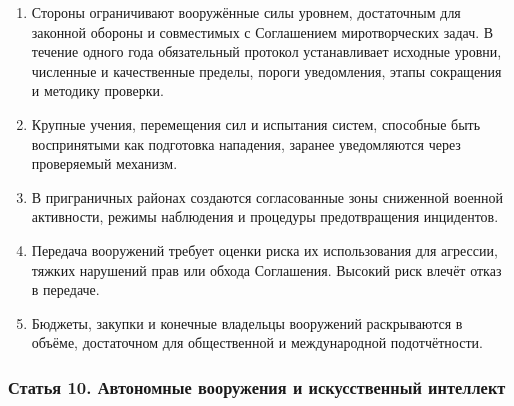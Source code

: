 \documentclass[
  russian,
  11pt,
  a4paper,
]{article}
\providecommand{\tightlist}{%
  \setlength{\itemsep}{0pt}\setlength{\parskip}{0pt}}
\begin{document}
\begin{enumerate}
\def\labelenumi{\arabic{enumi}.}
\tightlist
\item
  Стороны ограничивают вооружённые силы уровнем, достаточным для
  законной обороны и совместимых с Соглашением миротворческих задач. В
  течение одного года обязательный протокол устанавливает исходные
  уровни, численные и качественные пределы, пороги уведомления, этапы
  сокращения и методику проверки.
\item
  Крупные учения, перемещения сил и испытания систем, способные быть
  воспринятыми как подготовка нападения, заранее уведомляются через
  проверяемый механизм.
\item
  В приграничных районах создаются согласованные зоны сниженной военной
  активности, режимы наблюдения и процедуры предотвращения инцидентов.
\item
  Передача вооружений требует оценки риска их использования для
  агрессии, тяжких нарушений прав или обхода Соглашения. Высокий риск
  влечёт отказ в передаче.
\item
  Бюджеты, закупки и конечные владельцы вооружений раскрываются в
  объёме, достаточном для общественной и международной подотчётности.
\end{enumerate}

\subsubsection{Статья 10. Автономные вооружения и искусственный
интеллект}\label{ux441ux442ux430ux442ux44cux44f-10-ux430ux432ux442ux43eux43dux43eux43cux43dux44bux435-ux432ux43eux43eux440ux443ux436ux435ux43dux438ux44f-ux438-ux438ux441ux43aux443ux441ux441ux442ux432ux435ux43dux43dux44bux439-ux438ux43dux442ux435ux43bux43bux435ux43aux442}
\end{document}
